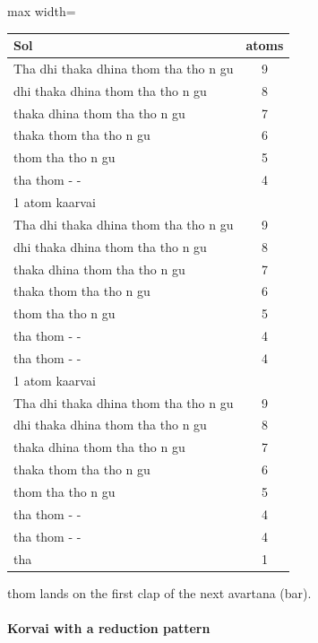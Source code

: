 \begin{center}
\begin{adjustbox}{max width=\textwidth}
\begin{tabular}{l c}
\toprule
Sol & atoms\\
\midrule
Tha dhi thaka dhina thom tha tho n gu & 9\\
dhi thaka dhina thom tha tho n gu     & 8\\
thaka dhina thom tha tho n gu         & 7\\
thaka thom tha tho n gu               & 6\\
thom tha tho n gu                     & 5\\
tha thom - -                          & 4\\
1 atom kaarvai                        & \\
\midrule
Tha dhi thaka dhina thom tha tho n gu & 9\\
dhi thaka dhina thom tha tho n gu     & 8\\
thaka dhina thom tha tho n gu         & 7\\
thaka thom tha tho n gu               & 6\\
thom tha tho n gu                     & 5\\
tha thom - -                          & 4\\
tha thom - -                          & 4\\
1 atom kaarvai                        & \\
\midrule
Tha dhi thaka dhina thom tha tho n gu & 9\\
dhi thaka dhina thom tha tho n gu     & 8\\
thaka dhina thom tha tho n gu         & 7\\
thaka thom tha tho n gu               & 6\\
thom tha tho n gu                     & 5\\
tha thom - -                          & 4\\
tha thom - -                          & 4\\
tha                                   & 1\\
\bottomrule
\end{tabular}
\end{adjustbox}
\end{center}
thom lands on the first clap of the next avartana (bar).

\paragraph{Korvai with a reduction pattern}

